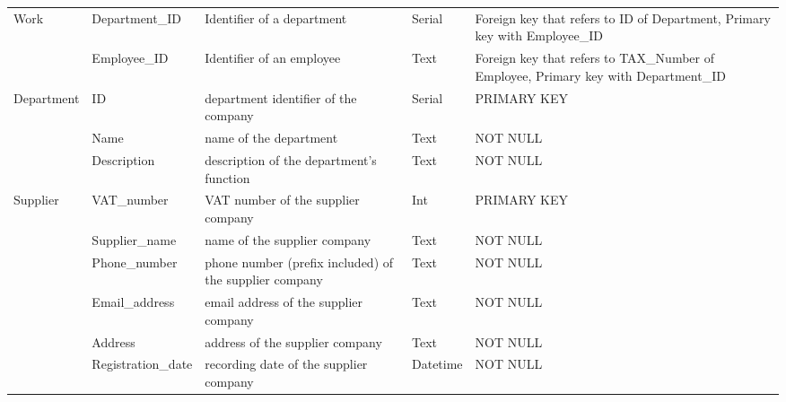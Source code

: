 \begin{longtable}{|p{}|p{} |p{}|p{}|p{} |}
\multirow{2}{*}{Work} & Department\_ID & Identifier of a department & Serial & Foreign key that refers to ID of Department, Primary key with Employee\_ID \\\cline{2-5}
& Employee\_ID & Identifier of an employee & Text & Foreign key that refers to TAX\_Number of Employee, Primary key with Department\_ID \\\hline

\multirow{3}{*}{Department} & ID & department identifier of the company & Serial & PRIMARY KEY\\\cline{2-5}
& Name & name of the department & Text & NOT NULL \\\cline{2-5}
& Description & description of the department's function & Text & NOT NULL \\\hline

\multirow{6}{*}{Supplier} & VAT\_number & VAT number of the supplier company & Int & PRIMARY KEY\\\cline{2-5}
& Supplier\_name & name of the supplier company & Text & NOT NULL \\\cline{2-5}
& Phone\_number & phone number (prefix included) of the supplier company  & Text & NOT NULL \\\cline{2-5} 
& Email\_address & email address of the supplier company & Text & NOT NULL \\\cline{2-5} 
& Address & address of the supplier company & Text & NOT NULL \\\cline{2-5} 
& Registration\_date & recording date of the supplier company & Datetime & NOT NULL \\\hline

\end{longtable}